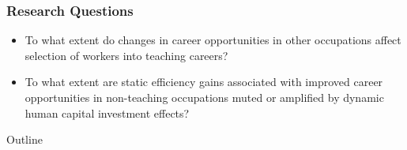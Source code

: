 \documentclass[11pt,hyperref={bookmarks=false},table,aspectratio=169]{beamer}
\begin{document}
	\begin{frame}
		\frametitle{Research Questions}
		\vfill
		\begin{itemize}
			\item To what extent do changes in career opportunities in other occupations affect selection of workers into teaching careers?
			\vfill
			\item To what extent are static efficiency gains associated with improved career opportunities in non-teaching occupations muted or amplified by dynamic human capital investment effects?
		\end{itemize}
		\vfill
	\end{frame}
	

 \begin{frame}{Outline}
\tableofcontents{}
\end{frame}
\end{document}
